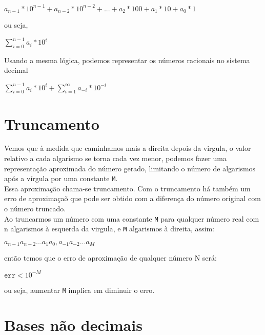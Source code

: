 \documentclass[12pt, onecolumn]{article}
\begin{document}
	\begin{center}
		$a_{n-1}*10^{n-1} + a_{n-2}*10^{n-2}
		+ ... + 
		a_{2}*100 + a_{1} * 10 + a_{0} * 1$
	\end{center}

	ou seja,

	\begin{center}
		$\sum_{i = 0}^{n - 1} a_{i} * 10^{i}$
	\end{center}

	Usando a mesma lógica, podemos representar os números racionais no sistema
	decimal
	
	\begin{center}
		$\sum_{i = 0}^{n - 1} a_{i} * 10^{i} + 
		\sum_{i = 1}^{\infty} a_{-i} * 10^{-i}$
	\end{center}

			\section{\centering Truncamento}

	Vemos que à medida que caminhamos mais a direita depois da virgula, o
	valor relativo a cada algarismo se torna cada vez menor, podemos
	fazer uma representação aproximada do número gerado, limitando 
	o número de algarismos após a vírgula por uma constante \texttt{M}.\\
	\newline
	Essa aproximação chama-se truncamento. Com o truncamento há também
	um erro de aproximaçaõ que pode ser obtido com a diferença do número original
	com o número truncado.\\
	\newline
	Ao truncarmos um número com uma constante \texttt{M} para qualquer 
	número real com n algarismos à esquerda da virgula, 
	e \texttt{M} algarismos à direita, assim: 

	\begin{center}
		$a_{n-1} a_{n-2} ... a_{1} a_{0}, a_{-1} a_{-2} ... a_{M}$
	\end{center}

	então temos que o erro de aproximação de qualquer número N será:

	\begin{center}
		$\texttt{err} < 10^{-M}$
	\end{center}
	
	ou seja, aumentar \texttt{M} implica em diminuir o erro.
	
			\section{\centering Bases não decimais}
\end{document}
